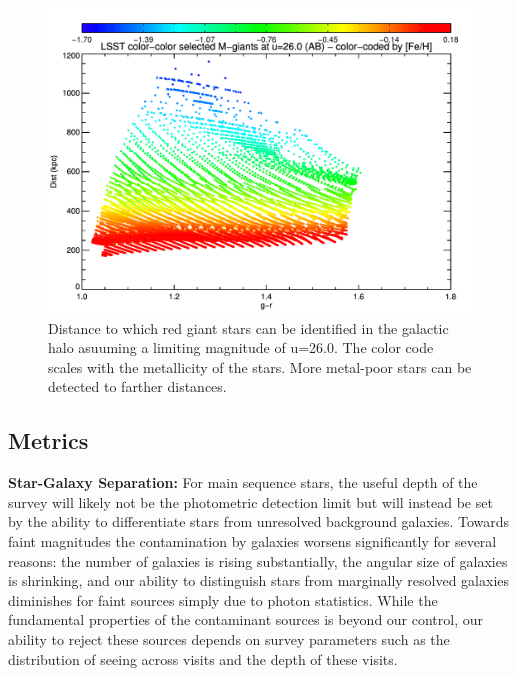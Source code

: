 \begin{figure}
\begin{center}
  \includegraphics[scale=0.5]{./figs/milkyway/lsst_mgiants_grdist.pdf}
  \caption{Distance to which red giant stars can be identified in the galactic halo asuuming a limiting magnitude
  of u=26.0. The color code scales with the metallicity of the stars. More metal-poor stars can be 
  detected to farther distances. \label{fig-MW-giants}}
\end{center}
\end{figure}



\subsection{Metrics}
\label{sec:\secname:MW_Halo_metrics}

\textbf{Star-Galaxy Separation:} For main sequence stars, the useful depth of
the survey will likely not be the photometric detection limit but will instead
be set by the ability to differentiate stars from unresolved background
galaxies. Towards faint magnitudes the contamination by galaxies worsens
significantly for several reasons: the number of galaxies is rising
substantially, the angular size of galaxies is shrinking, and our ability to
distinguish stars from marginally resolved galaxies diminishes for faint
sources simply due to photon statistics. While the fundamental properties of
the contaminant sources is beyond our control, our ability to reject these
sources depends on survey parameters such as the distribution of seeing across
visits and the depth of these visits.

